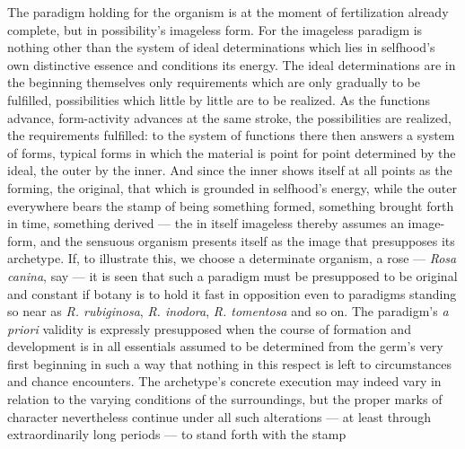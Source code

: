 \documentclass[12pt,a4paper]{book}
\begin{document}
The paradigm holding for the organism is at the moment of fertilization already
complete, but in possibility's imageless form. For the imageless paradigm is
nothing other than the system of ideal determinations which lies in selfhood's
own distinctive essence and conditions its energy. The ideal determinations are
in the beginning themselves only requirements which are only gradually to be
fulfilled, possibilities which little by little are to be realized. As the
functions advance, form-activity advances at the same stroke, the possibilities
are realized, the requirements fulfilled: to the system of functions there then
answers a system of forms, typical forms in which the material is point for
point determined by the ideal, the outer by the inner. And since the inner
shows itself at all points as the forming, the original, that which is grounded
in selfhood's energy, while the outer everywhere bears the stamp of being
something formed, something brought forth in time, something derived --- the in
itself imageless thereby assumes an image-form, and the sensuous organism
presents itself as the image that presupposes its archetype. If, to illustrate
this, we choose a determinate organism, a rose --- \textit{Rosa canina}, say
--- it is seen that such a paradigm must be presupposed to be original and
constant if botany is to hold it fast in opposition even to paradigms standing
so near as \textit{R. rubiginosa}, \textit{R. inodora},
\textit{R. tomentosa} and so on. The paradigm's \textit{a priori} validity is
expressly presupposed when the course of formation and development is in all
essentials assumed to be determined from the germ's very first beginning in
such a way that nothing in this respect is left to circumstances and chance
encounters. The archetype's concrete execution may indeed vary in relation to
the varying conditions of the surroundings, but the proper marks of character
nevertheless continue under all such alterations --- at least through
extraordinarily long periods --- to stand forth with the stamp
\end{document}
